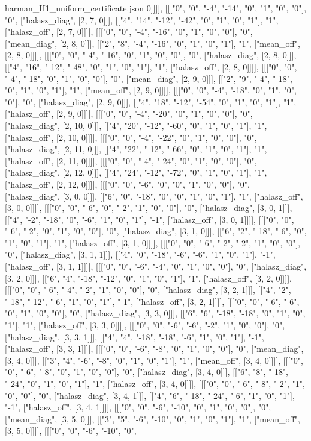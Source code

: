 \begin{filecontents*}[overwrite]{harman_H1_uniform_certificate.json}
0]]]], [[["0", "0", "-4", "-14", "0", "1", "0", "0"], "0", ["halasz_diag", [2, 7, 0]]], [["4", "14", "-12", "-42", "0", "1", "0", "1"], "1", ["halasz_off", [2, 7, 0]]]], [[["0", "0", "-4", "-16", "0", "1", "0", "0"], "0", ["mean_diag", [2, 8, 0]]], [["2", "8", "-4", "-16", "0", "1", "0", "1"], "1", ["mean_off", [2, 8, 0]]]], [[["0", "0", "-4", "-16", "0", "1", "0", "0"], "0", ["halasz_diag", [2, 8, 0]]], [["4", "16", "-12", "-48", "0", "1", "0", "1"], "1", ["halasz_off", [2, 8, 0]]]], [[["0", "0", "-4", "-18", "0", "1", "0", "0"], "0", ["mean_diag", [2, 9, 0]]], [["2", "9", "-4", "-18", "0", "1", "0", "1"], "1", ["mean_off", [2, 9, 0]]]], [[["0", "0", "-4", "-18", "0", "1", "0", "0"], "0", ["halasz_diag", [2, 9, 0]]], [["4", "18", "-12", "-54", "0", "1", "0", "1"], "1", ["halasz_off", [2, 9, 0]]]], [[["0", "0", "-4", "-20", "0", "1", "0", "0"], "0", ["halasz_diag", [2, 10, 0]]], [["4", "20", "-12", "-60", "0", "1", "0", "1"], "1", ["halasz_off", [2, 10, 0]]]], [[["0", "0", "-4", "-22", "0", "1", "0", "0"], "0", ["halasz_diag", [2, 11, 0]]], [["4", "22", "-12", "-66", "0", "1", "0", "1"], "1", ["halasz_off", [2, 11, 0]]]], [[["0", "0", "-4", "-24", "0", "1", "0", "0"], "0", ["halasz_diag", [2, 12, 0]]], [["4", "24", "-12", "-72", "0", "1", "0", "1"], "1", ["halasz_off", [2, 12, 0]]]], [[["0", "0", "-6", "0", "0", "1", "0", "0"], "0", ["halasz_diag", [3, 0, 0]]], [["6", "0", "-18", "0", "0", "1", "0", "1"], "1", ["halasz_off", [3, 0, 0]]]], [[["0", "0", "-6", "0", "-2", "1", "0", "0"], "0", ["halasz_diag", [3, 0, 1]]], [["4", "-2", "-18", "0", "-6", "1", "0", "1"], "-1", ["halasz_off", [3, 0, 1]]]], [[["0", "0", "-6", "-2", "0", "1", "0", "0"], "0", ["halasz_diag", [3, 1, 0]]], [["6", "2", "-18", "-6", "0", "1", "0", "1"], "1", ["halasz_off", [3, 1, 0]]]], [[["0", "0", "-6", "-2", "-2", "1", "0", "0"], "0", ["halasz_diag", [3, 1, 1]]], [["4", "0", "-18", "-6", "-6", "1", "0", "1"], "-1", ["halasz_off", [3, 1, 1]]]], [[["0", "0", "-6", "-4", "0", "1", "0", "0"], "0", ["halasz_diag", [3, 2, 0]]], [["6", "4", "-18", "-12", "0", "1", "0", "1"], "1", ["halasz_off", [3, 2, 0]]]], [[["0", "0", "-6", "-4", "-2", "1", "0", "0"], "0", ["halasz_diag", [3, 2, 1]]], [["4", "2", "-18", "-12", "-6", "1", "0", "1"], "-1", ["halasz_off", [3, 2, 1]]]], [[["0", "0", "-6", "-6", "0", "1", "0", "0"], "0", ["halasz_diag", [3, 3, 0]]], [["6", "6", "-18", "-18", "0", "1", "0", "1"], "1", ["halasz_off", [3, 3, 0]]]], [[["0", "0", "-6", "-6", "-2", "1", "0", "0"], "0", ["halasz_diag", [3, 3, 1]]], [["4", "4", "-18", "-18", "-6", "1", "0", "1"], "-1", ["halasz_off", [3, 3, 1]]]], [[["0", "0", "-6", "-8", "0", "1", "0", "0"], "0", ["mean_diag", [3, 4, 0]]], [["3", "4", "-6", "-8", "0", "1", "0", "1"], "1", ["mean_off", [3, 4, 0]]]], [[["0", "0", "-6", "-8", "0", "1", "0", "0"], "0", ["halasz_diag", [3, 4, 0]]], [["6", "8", "-18", "-24", "0", "1", "0", "1"], "1", ["halasz_off", [3, 4, 0]]]], [[["0", "0", "-6", "-8", "-2", "1", "0", "0"], "0", ["halasz_diag", [3, 4, 1]]], [["4", "6", "-18", "-24", "-6", "1", "0", "1"], "-1", ["halasz_off", [3, 4, 1]]]], [[["0", "0", "-6", "-10", "0", "1", "0", "0"], "0", ["mean_diag", [3, 5, 0]]], [["3", "5", "-6", "-10", "0", "1", "0", "1"], "1", ["mean_off", [3, 5, 0]]]], [[["0", "0", "-6", "-10", "0", 
\end{filecontents*}
